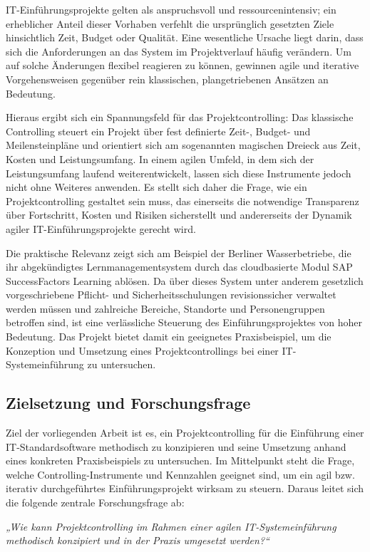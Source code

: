 \documentclass[
    12pt, 
    a4paper,
    ]{scrartcl} %
\begin{document}
IT-Einführungsprojekte gelten als anspruchsvoll und ressourcenintensiv; ein erheblicher Anteil dieser Vorhaben verfehlt die ursprünglich gesetzten Ziele hinsichtlich Zeit, Budget oder Qualität. Eine wesentliche Ursache liegt darin, dass sich die Anforderungen an das System im Projektverlauf häufig verändern. Um auf solche Änderungen flexibel reagieren zu können, gewinnen agile und iterative Vorgehensweisen gegenüber rein klassischen, plangetriebenen Ansätzen an Bedeutung.

Hieraus ergibt sich ein Spannungsfeld für das Projektcontrolling: Das klassische Controlling steuert ein Projekt über fest definierte Zeit-, Budget- und Meilensteinpläne und orientiert sich am sogenannten magischen Dreieck aus Zeit, Kosten und Leistungsumfang. In einem agilen Umfeld, in dem sich der Leistungsumfang laufend weiterentwickelt, lassen sich diese Instrumente jedoch nicht ohne Weiteres anwenden. Es stellt sich daher die Frage, wie ein Projektcontrolling gestaltet sein muss, das einerseits die notwendige Transparenz über Fortschritt, Kosten und Risiken sicherstellt und andererseits der Dynamik agiler IT-Einführungsprojekte gerecht wird.

Die praktische Relevanz zeigt sich am Beispiel der Berliner Wasserbetriebe, die ihr abgekündigtes Lernmanagementsystem durch das cloudbasierte Modul SAP SuccessFactors Learning ablösen. Da über dieses System unter anderem gesetzlich vorgeschriebene Pflicht- und Sicherheitsschulungen revisionssicher verwaltet werden müssen und zahlreiche Bereiche, Standorte und Personengruppen betroffen sind, ist eine verlässliche Steuerung des Einführungsprojektes von hoher Bedeutung. Das Projekt bietet damit ein geeignetes Praxisbeispiel, um die Konzeption und Umsetzung eines Projektcontrollings bei einer IT-Systemeinführung zu untersuchen.

\subsection{Zielsetzung und Forschungsfrage}
Ziel der vorliegenden Arbeit ist es, ein Projektcontrolling für die Einführung einer IT-Standardsoftware methodisch zu konzipieren und seine Umsetzung anhand eines konkreten Praxisbeispiels zu untersuchen. Im Mittelpunkt steht die Frage, welche Controlling-Instrumente und Kennzahlen geeignet sind, um ein agil bzw. iterativ durchgeführtes Einführungsprojekt wirksam zu steuern. Daraus leitet sich die folgende zentrale Forschungsfrage ab:

\textit{„Wie kann Projektcontrolling im Rahmen einer agilen IT-Systemeinführung methodisch konzipiert und in der Praxis umgesetzt werden?“}
\end{document}
